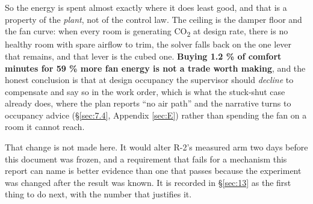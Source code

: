 So the energy is spent almost exactly where it does least good, and that is a property of the
\emph{plant}, not of the control law. The ceiling is the damper floor and the fan curve: when every
room is generating CO\textsubscript{2} at design rate, there is no healthy room with spare airflow
to trim, the solver falls back on the one lever that remains, and that lever is the cubed one.
\textbf{Buying 1.2 \% of comfort minutes for 59 \% more fan energy is not a trade worth making},
and the honest conclusion is that at design occupancy the supervisor should \emph{decline} to
compensate and say so in the work order, which is what the stuck-shut case already does, where
the plan reports ``no air path'' and the narrative turns to occupancy advice (§\ref{sec:7.4}, Appendix \ref{sec:E})
rather than spending the fan on a room it cannot reach.

That change is not made here. It would alter R-2's measured arm two days before this document was
frozen, and a requirement that fails for a mechanism this report can name is better evidence than
one that passes because the experiment was changed after the result was known. It is recorded in
§\ref{sec:13} as the first thing to do next, with the number that justifies it.
